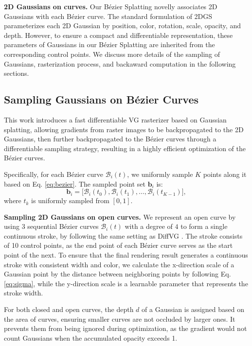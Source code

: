 \noindent\textbf{2D Gaussians on curves.}  
Our Bézier Splatting novelly associates 2D Gaussians with each Bézier curve. The standard formulation of 2DGS \cite{Huang2DGS2024} parameterizes each 2D Gaussian by position, color, rotation, scale, opacity, and depth.
However, to ensure a compact and differentiable representation, these parameters of Gaussians in our Bézier Splatting are inherited from the corresponding control points. We discuss more details of the sampling of Gaussians, rasterization process, and backaward computation in the following sections.


\vspace{-.5em}
\subsection{Sampling Gaussians on Bézier Curves}
\vspace{-.5em}

This work introduces a fast differentiable VG rasterizer based on Gaussian splatting, allowing gradients from raster images to be backpropagated to the 2D Gaussians, then further backpropagated to the Bézier curves through a differentiable sampling strategy, resulting in a highly efficient optimization of the Bézier curves.  


Specifically, for each Bézier curve $\mathcal{B}_i(t)$, we uniformly sample $K$ points along it based on Eq. \ref{eq:bezier}. The sampled point set $\mathbf{b}_i$ is: 
\begin{equation}
\mathbf{b}_i = \big[ \mathcal{B}_i(t_0), \mathcal{B}_i(t_1), \dots, \mathcal{B}_i(t_{K-1}) \big],
\label{eq:sampling}
\end{equation}
where $t_k$ is uniformly sampled from \([0,1]\).

\noindent\textbf{Sampling 2D Gaussians on open curves.} We represent an open curve by using $3$ sequential Bézier curves $\mathcal{B}_i(t)$ with a degree of $4$ to form a single continuous stroke, by following the same setting as DiffVG \cite{Li:2020:DVG}. The stroke consists of 10 control points, as the end point of each Bézier curve serves as the start point of the next. To ensure that the final rendering result generates a continuous stroke with consistent width and color, we calculate the x-direction scale of a Gaussian point by the distance between neighboring points by following Eq. \ref{eq:sigma}, while the y-direction scale is a learnable parameter that represents the stroke width. 

For both closed and open curves, the depth $d$ of a Gaussian is assigned based on the area of curves, ensuring smaller curves are not occluded by larger ones. It prevents them from being ignored during optimization, as the gradient would not count Gaussians when the accumulated opacity exceeds 1.

